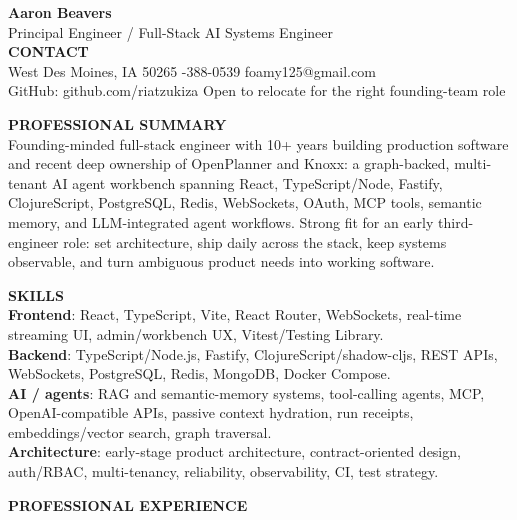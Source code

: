 \documentclass[10pt]{article}
\begin{document}
{\LARGE \textbf{Aaron Beavers}}\\
Principal Engineer / Full-Stack AI Systems Engineer\\

\vspace{2pt}
\textbf{CONTACT}\\
West Des Moines, IA 50265 \;\;\textbar\;-388-0539 \;\;\textbar\;\; foamy125@gmail.com\\
GitHub: github.com/riatzukiza \;\;\textbar\;\; Open to relocate for the right founding-team role

\vspace{3pt}
\textbf{PROFESSIONAL SUMMARY}\\
Founding-minded full-stack engineer with 10+ years building production software and recent deep ownership of OpenPlanner and Knoxx: a graph-backed, multi-tenant AI agent workbench spanning React, TypeScript/Node, Fastify, ClojureScript, PostgreSQL, Redis, WebSockets, OAuth, MCP tools, semantic memory, and LLM-integrated agent workflows. Strong fit for an early third-engineer role: set architecture, ship daily across the stack, keep systems observable, and turn ambiguous product needs into working software.

\vspace{2pt}
\textbf{SKILLS}\\
\textbf{Frontend}: React, TypeScript, Vite, React Router, WebSockets, real-time streaming UI, admin/workbench UX, Vitest/Testing Library.\\
\textbf{Backend}: TypeScript/Node.js, Fastify, ClojureScript/shadow-cljs, REST APIs, WebSockets, PostgreSQL, Redis, MongoDB, Docker Compose.\\
\textbf{AI / agents}: RAG and semantic-memory systems, tool-calling agents, MCP, OpenAI-compatible APIs, passive context hydration, run receipts, embeddings/vector search, graph traversal.\\
\textbf{Architecture}: early-stage product architecture, contract-oriented design, auth/RBAC, multi-tenancy, reliability, observability, CI, test strategy.

\vspace{3pt}
\textbf{PROFESSIONAL EXPERIENCE}\\
\end{document}
